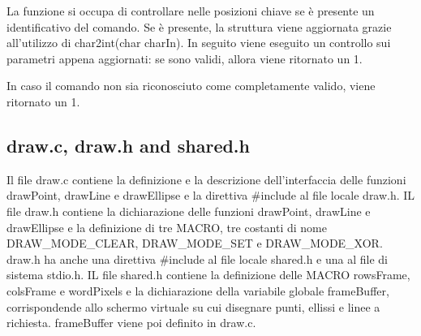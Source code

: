 \documentclass{article}
\begin{document}
			La funzione si occupa di controllare nelle posizioni chiave se è presente un identificativo del comando.
			Se è presente, la struttura viene aggiornata grazie all'utilizzo di char2int(char charIn).
			In seguito viene eseguito un controllo sui parametri appena aggiornati: se sono validi, allora viene
			ritornato un 1.

			In caso il comando non sia riconosciuto come completamente valido, viene ritornato un 1.
      \subsection{draw.c, draw.h and shared.h}
      Il file draw.c contiene la definizione e la descrizione dell'interfaccia delle funzioni drawPoint, drawLine e drawEllipse e la direttiva \#include al file locale draw.h.
      IL file draw.h contiene la dichiarazione delle funzioni drawPoint, drawLine e drawEllipse e la definizione di tre MACRO, tre costanti di nome DRAW\_MODE\_CLEAR, DRAW\_MODE\_SET e DRAW\_MODE\_XOR.
      draw.h ha anche una direttiva \#include al file locale shared.h e una al file di sistema stdio.h.
      IL file shared.h contiene la definizione delle MACRO rowsFrame, colsFrame e wordPixels e la dichiarazione  della variabile globale frameBuffer,
      corrispondende allo schermo virtuale su cui disegnare punti, ellissi e linee a richiesta. frameBuffer viene poi definito in draw.c.
\end{document}
